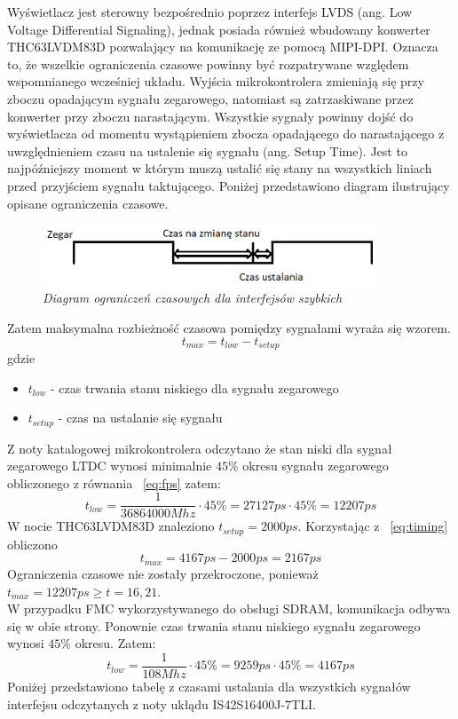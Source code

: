 \documentclass[eng,printmode]{mgr}
\begin{document}
Wyświetlacz jest sterowny bezpośrednio poprzez interfejs LVDS (ang. Low Voltage Differential Signaling), jednak  posiada również wbudowany konwerter THC63LVDM83D pozwalający na komunikację ze pomocą MIPI-DPI. Oznacza to, że wszelkie ograniczenia czasowe powinny być rozpatrywane względem wspomnianego wcześniej układu. Wyjścia
mikrokontrolera zmieniają się przy zboczu opadającym sygnału zegarowego, natomiast są zatrzaskiwane przez konwerter przy zboczu narastającym. Wszystkie sygnały powinny dojść do wyświetlacza od momentu wystąpieniem zbocza opadającego do narastającego z uwzględnieniem czasu na ustalenie się sygnału (ang. Setup Time). Jest to najpóźniejszy moment w którym muszą ustalić się stany na wszystkich liniach przed przyjściem sygnału taktującego. Poniżej przedstawiono diagram ilustrujący opisane ograniczenia czasowe.

\begin{figure}[!h]
    \centering
    \includegraphics[width=10cm]{plots/timing.png}
    \caption{\textit{Diagram ograniczeń czasowych dla interfejsów szybkich}}
\end{figure}

Zatem maksymalna rozbieżność czasowa pomiędzy sygnałami wyraża się wzorem.
\begin{equation}
t_{max} = t_{low}- t_{setup} \label{eq:timing}
\end{equation}
gdzie
\begin{itemize}
  \item \textbf{$t_{low}$} - czas trwania stanu niskiego dla sygnału zegarowego
  \item \textbf{$t_{setup}$} - czas na ustalanie się sygnału
\end{itemize}

Z noty katalogowej mikrokontrolera odczytano że stan niski dla sygnał zegarowego LTDC wynosi minimalnie $45\%$
okresu sygnału zegarowego obliczonego z równania ~\ref{eq:fps} zatem:
$$
t_{low} = \frac{1}{36864000Mhz} \cdot 45\% = 27127ps\cdot45\% = 12207ps
$$
W nocie THC63LVDM83D znaleziono $t_{setup} = 2000ps$. Korzystając z ~\ref{eq:timing} obliczono
$$
t_{max} = 4167ps - 2000ps = 2167ps
$$
Ograniczenia czasowe nie zostały przekroczone, ponieważ $t_{max}= 12207ps \geq t=16,21$.\\

W przypadku FMC wykorzystywanego do obsługi SDRAM, komunikacja odbywa się w obie strony. Ponownie czas trwania stanu niskiego sygnału zegarowego wynosi $45\%$ okresu. Zatem:
$$
t_{low} = \frac{1}{108Mhz} \cdot 45\% = 9259ps\cdot45\% = 4167ps
$$
 Poniżej przedstawiono tabelę z czasami ustalania dla wszystkich sygnałów interfejsu odczytanych z noty ukłądu IS42S16400J-7TLI.
\end{document}
